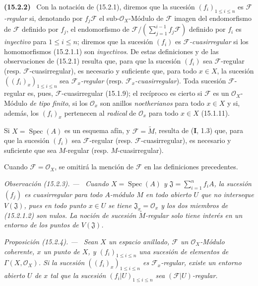 \documentclass[10pt,oneside]{book}
\makeatletter
\newcommand{\setmanualcurrentlabel}[1]{\def\@currentlabel{#1}}
\newenvironment{env}[1][]{\setmanualcurrentlabel{#1}\par\medskip\noindent\textbf{(#1)}\ }{\par}
\newenvironment{proposition}[1][]{%
  \setmanualcurrentlabel{#1}\par\medskip\noindent\itshape Proposición (#1). ---\ }{\par}
\newenvironment{remark}[1][]{%
  \setmanualcurrentlabel{#1}\par\medskip\noindent\itshape Observación (#1). ---\ }{\par}
\makeatother
\begin{document}
\begin{env}[15.2.2]
\label{0.15.2.2-es}
Con la notación de (15.2.1), diremos que la sucesión
$(f_i)_{1\leq i\leq n}$ es \emph{$\mathscr{F}$-regular} si, denotando por
$f_j\mathscr{F}$ el sub-$\mathcal{O}_X$-Módulo de $\mathscr{F}$ imagen del
endomorfismo de $\mathscr{F}$ definido por $f_j$, el endomorfismo de
$\mathscr{F}/(\sum_{j=1}^{i-1}f_j\mathscr{F})$ definido por $f_i$ es \emph{inyectivo}
para $1\leq i\leq n$; diremos que la sucesión $(f_i)$ es
\emph{$\mathscr{F}$-cuasirregular} si los homomorfismos (15.2.1.1) son \emph{inyectivos}.
De estas definiciones y de las observaciones de (15.2.1) resulta que, para que
la sucesión $(f_i)$ sea $\mathscr{F}$-regular (resp.
$\mathscr{F}$-cuasirregular), es necesario y suficiente que, para todo
$x\in X$, la sucesión $((f_i)_x)_{1\leq i\leq n}$ sea
\emph{$\mathscr{F}_x$-regular} (resp. \emph{$\mathscr{F}_x$-cuasirregular}). Toda sucesión
$\mathscr{F}$-regular es, pues, $\mathscr{F}$-cuasirregular (15.1.9); el
recíproco es cierto si $\mathscr{F}$ es un $\mathcal{O}_X$-Módulo \emph{de tipo
finito}, si los $\mathcal{O}_x$ son anillos \emph{noetherianos} para todo $x\in X$ y
si, además, los $(f_i)_x$ pertenecen al \emph{radical} de $\mathcal{O}_x$ para todo
$x\in X$ (15.1.11).

Si $X=\operatorname{Spec}(A)$ es un esquema afín, y
$\mathscr{F}=\widetilde{M}$, resulta de (\textbf I, 1.3) que, para que la sucesión
$(f_i)$ sea $\mathscr{F}$-regular (resp. $\mathscr{F}$-cuasirregular), es
necesario y suficiente que sea $M$-regular (resp. $M$-cuasirregular).

Cuando $\mathscr{F}=\mathcal{O}_X$, se omitirá la mención de $\mathscr{F}$ en
las definiciones precedentes.
\end{env}

\begin{remark}[15.2.3]
\label{0.15.2.3-es}
Cuando $X=\operatorname{Spec}(A)$ y
$\mathfrak{J}=\sum_{i=1}^n f_iA$, la sucesión $(f_j)$ es cuasirregular para
\emph{todo} $A$-módulo $M$ en todo abierto $U$ \emph{que no interseque}
$V(\mathfrak{J})$, pues en todo punto $x\in U$ se tiene
$\mathfrak{J}_x=\mathcal{O}_x$ y los dos miembros de (15.2.1.2) son nulos. La
noción de sucesión $\widetilde{M}$-regular solo tiene interés en un entorno de
los puntos de $V(\mathfrak{J})$.
\end{remark}

\begin{proposition}[15.2.4]
\label{0.15.2.4-es}
Sean $X$ un espacio anillado, $\mathscr{F}$ un $\mathcal{O}_X$-Módulo
coherente, $x$ un punto de $X$, y $(f_i)_{1\leq i\leq n}$ una sucesión de
elementos de $\Gamma(X,\mathcal{O}_X)$. Si la sucesión
$((f_i)_x)_{1\leq i\leq n}$ es $\mathscr{F}_x$-regular, existe un entorno
abierto $U$ de $x$ tal que la sucesión $(f_i|U)_{1\leq i\leq n}$ sea
$(\mathscr{F}|U)$-regular.
\end{proposition}
\end{document}
